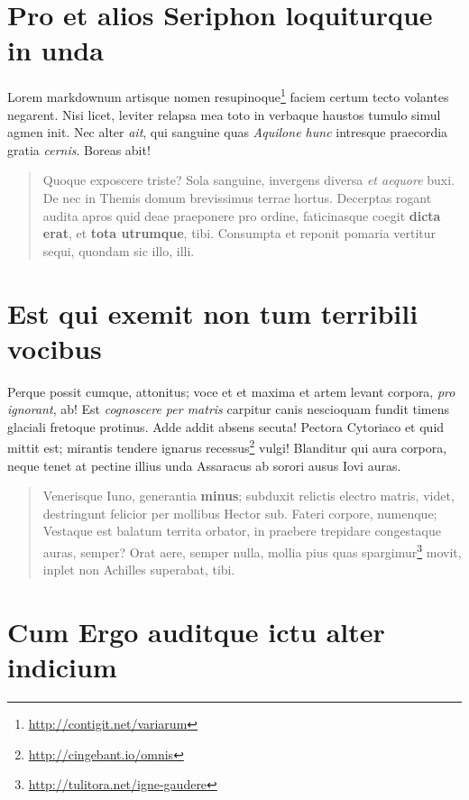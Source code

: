 \documentclass[10pt,]{book}
\DeclareRobustCommand{\href}[2]{#2\footnote{\url{#1}}}
\begin{document}
\hypertarget{pro-et-alios-seriphon-loquiturque-in-unda}{%
\section{Pro et alios Seriphon loquiturque in
unda}\label{pro-et-alios-seriphon-loquiturque-in-unda}}

Lorem markdownum artisque \href{http://contigit.net/variarum}{nomen
resupinoque} faciem certum tecto volantes negarent. Nisi licet, leviter
relapsa mea toto in verbaque haustos tumulo simul agmen init. Nec alter
\emph{ait}, qui sanguine quas \emph{Aquilone hunc} intresque praecordia
gratia \emph{cernis}. Boreas abit!

\begin{quote}
Quoque exposcere triste? Sola sanguine, invergens diversa \emph{et
aequore} buxi. De nec in Themis domum brevissimus terrae hortus.
Decerptas rogant audita apros quid deae praeponere pro ordine,
faticinasque coegit \textbf{dicta erat}, et \textbf{tota utrumque},
tibi. Consumpta et reponit pomaria vertitur sequi, quondam sic illo,
illi.
\end{quote}

\hypertarget{est-qui-exemit-non-tum-terribili-vocibus}{%
\section{Est qui exemit non tum terribili
vocibus}\label{est-qui-exemit-non-tum-terribili-vocibus}}

Perque possit cumque, attonitus; voce et et maxima et artem levant
corpora, \emph{pro ignorant}, ab! Est \emph{cognoscere per matris}
carpitur canis nescioquam fundit timens glaciali fretoque protinus. Adde
addit absens secuta! Pectora Cytoriaco et quid mittit est; mirantis
tendere ignarus \href{http://cingebant.io/omnis}{recessus} vulgi!
Blanditur qui aura corpora, neque tenet at pectine illius unda Assaracus
ab sorori ausus Iovi auras.

\begin{quote}
Venerisque Iuno, generantia \textbf{minus}; subduxit relictis electro
matris, videt, destringunt felicior per mollibus Hector sub. Fateri
corpore, numenque; Vestaque est balatum territa orbator, in praebere
trepidare congestaque auras, semper? Orat aere, semper nulla, mollia
pius quas \href{http://tulitora.net/igne-gaudere}{spargimur} movit,
inplet non Achilles superabat, tibi.
\end{quote}

\hypertarget{cum-ergo-auditque-ictu-alter-indicium}{%
\section{Cum Ergo auditque ictu alter
indicium}\label{cum-ergo-auditque-ictu-alter-indicium}}
\end{document}
